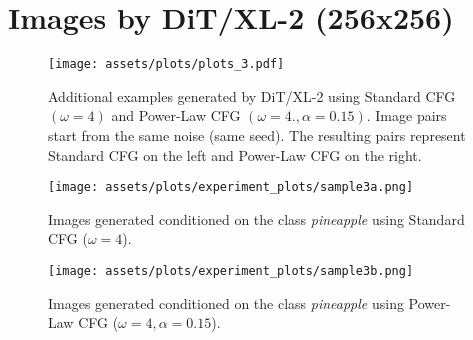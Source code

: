 \clearpage

\section{Images by DiT/XL-2 (256x256)}
\label{appx:ex_by_dit}
\begin{figure}[H]
    \centering
    \texttt{[image: assets/plots/plots\_3.pdf]}
    \caption{Additional examples generated by DiT/XL-2 using Standard CFG $(\omega=4)$ and Power-Law CFG $(\omega=4., \alpha=0.15)$. Image pairs start from the same noise (same seed). The resulting pairs represent Standard CFG on the left and Power-Law CFG on the right.}
    \label{fig:enter-label}
\end{figure}
\begin{figure}[H]
    \centering
    \begin{minipage}{0.85\linewidth}
        \centering
        \texttt{[image: assets/plots/experiment\_plots/sample3a.png]}
        \caption{Images generated conditioned on the class \textit{pineapple} using Standard CFG ($\omega=4$).}
        
        \vspace{1em} %
        
        \texttt{[image: assets/plots/experiment\_plots/sample3b.png]} 
        \caption{Images generated conditioned on the class \textit{pineapple} using Power-Law CFG ($\omega=4, \alpha=0.15$).}
    \end{minipage}
\end{figure}
